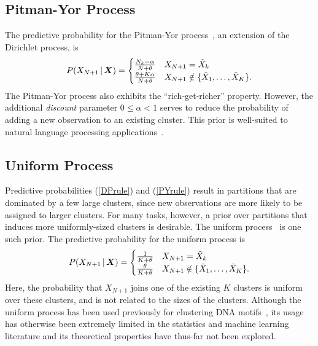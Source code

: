 \documentclass{article}
\begin{document}
\subsection{Pitman-Yor Process}

The predictive probability for the Pitman-Yor process~\cite{PitYor97},
an extension of the Dirichlet process, is
\begin{equation}
P(X_{N+1} \,|\, \boldsymbol{X}) = \begin{cases}
\frac{N_k-\alpha}{N + \theta} & X_{N + 1} = \tilde{X}_k\\
\frac{\theta + K \alpha}{N + \theta} & X_{N + 1} \notin \{\tilde{X}_1,
\ldots, \tilde{X}_K\}.\label{PYrule}
\end{cases}
\end{equation}
The Pitman-Yor process also exhibits the ``rich-get-richer''
property. However, the additional \emph{discount} parameter $0 \leq
\alpha < 1$ serves to reduce the probability of adding a new
observation to an existing cluster.  This prior is well-suited to
natural language processing applications~\cite{Teh06, Wallach08}.

\subsection{Uniform Process}

Predictive probabilities (\ref{DPrule}) and (\ref{PYrule}) result in
partitions that are dominated by a few large clusters, since new
observations are more likely to be assigned to larger clusters. For
many tasks, however, a prior over partitions that induces more
uniformly-sized clusters is desirable. The uniform
process~\cite{QinMcCTho03,JenLiu08} is one such prior. The predictive
probability for the uniform process is
\begin{equation}
P(X_{N+1} \,|\, \boldsymbol{X}) = \begin{cases}
\frac{1}{K + \theta} & X_{N + 1} = \tilde{X}_k\\
\frac{\theta}{K + \theta} & X_{N + 1} \notin \{\tilde{X}_1, \ldots,
\tilde{X}_K\}.\label{UNrule}
\end{cases}
\end{equation}
Here, the probability that $X_{N+1}$ joins one of the existing $K$
clusters is uniform over these clusters, and is not related to the
sizes of the clusters. Although the uniform process has been used
previously for clustering DNA motifs~\cite{QinMcCTho03,JenLiu08}, its
usage has otherwise been extremely limited in the statistics and
machine learning literature and its theoretical properties have
thus-far not been explored.
\end{document}
